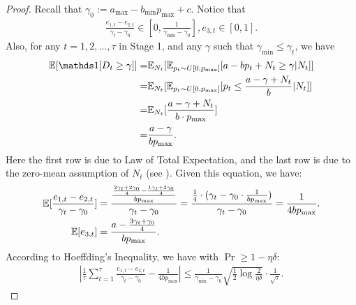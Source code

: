 \begin{proof}
    Recall that $\gamma_0:=a_{\max} - b_{\min}p_{\max} + c$. Notice that
    \begin{equation}
        \label{eq:e_1_t-e_2_t_fraction_range}
        \begin{aligned}
            \frac{e_{1,t}-e_{2,t}}{\gamma_t - \gamma_0}\in[0, \frac1{\gamma_{\min}-\gamma_0}], e_{3,t}\in[0,1].
        \end{aligned}
    \end{equation}
    Also, for any $t=1,2,\ldots, \tau$ in Stage 1, and any $\gamma$ such that $\gamma_{\min}\leq \gamma_t$, we have
    \begin{equation}
        \label{eq:expectation_indicator_primary}
        \begin{aligned}
            \E[\ind[D_t\geq \gamma]]=&\E_{N_t}[\E_{p_t\sim U[0, p_{\max}]}[a-bp_t+N_t\geq \gamma|N_t]]\\
            =&\E_{N_t}[\E_{p_t\sim U[0, p_{\max}]}[p_t\leq\frac{a-\gamma+N_t}{b}|N_t]]\\
            =&\E_{N_t}[\frac{a-\gamma+N_t}{b\cdot p_{\max}}]\\
            =&\frac{a-\gamma}{bp_{\max}}.
        \end{aligned}
    \end{equation}
    Here the first row is due to Law of Total Expectation, and the last row is due to the zero-mean assumption of $N_t$ (see ). Given this equation, we have:
    \begin{equation}
        \label{eq:expectation_e_i_t_results}
        \begin{aligned}
            \mathbb{E}[\frac{e_{1,t}-e_{2,t}}{\gamma_t-\gamma_0}]&=\frac{\frac{\frac{2\gamma_t + 2\gamma_0}4 - \frac{1\gamma_t + 3\gamma_0}4}{bp_{\max}}}{\gamma_t - \gamma_0}=\frac{\frac14\cdot(\gamma_t-\gamma_0\cdot\frac1{bp_{\max}})}{\gamma_t-\gamma_0}=\frac1{4bp_{\max}}.\\
            \mathbb{E}[e_{3,t}]&=\frac{a-\frac{3\gamma_t+\gamma_0}4}{bp_{\max}}.
        \end{aligned}
    \end{equation}
    According to Hoeffding's Inequality, we have with $\Pr\geq 1-\eta\delta$:
    \begin{equation}
        \label{eq:hoeffding_b}
        \begin{aligned}
            |\frac1{\tau}\sum_{t=1}^{\tau}\frac{e_{1,t}-e_{2,t}}{\gamma_t - \gamma_0} - \frac1{4bp_{\max}}|\leq\frac1{\gamma_{\min}-\gamma_0}\sqrt{\frac12\log\frac{2}{\eta\delta}}\cdot\frac1{\sqrt{\tau}}.

\end{aligned}
\end{equation}
\end{proof}

